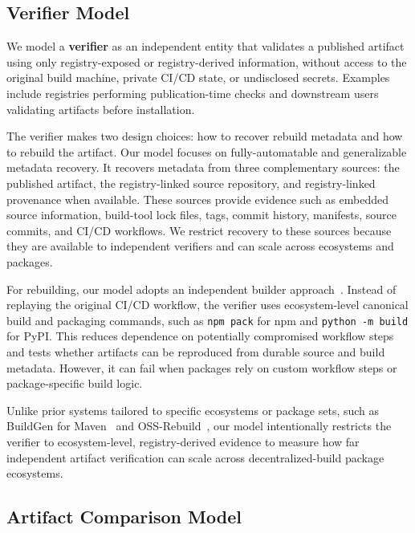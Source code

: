 \subsection{Verifier Model}
\label{subsec:verifier-model}

We model a \textbf{verifier} as an independent entity that validates a published artifact using only registry-exposed or registry-derived information, without access to the original build machine, private CI/CD state, or undisclosed secrets. Examples include registries performing publication-time checks and downstream users validating artifacts before installation.

The verifier makes two design choices: how to recover rebuild metadata and how to rebuild the artifact. 
Our model focuses on fully-automatable and generalizable metadata recovery.
It recovers metadata from three complementary sources: the published artifact, the registry-linked source repository, and registry-linked provenance when available. 
These sources provide evidence such as embedded source information, build-tool lock files, tags, commit history, manifests, source commits, and CI/CD workflows. 
We restrict recovery to these sources because they are available to independent verifiers and can scale across ecosystems and packages.

For rebuilding, our model adopts an independent builder approach~\cite{lamb_reproducible_2022}. 
Instead of replaying the original CI/CD workflow, the verifier uses ecosystem-level canonical build and packaging commands, such as \texttt{npm pack} for npm and \texttt{python -m build} for PyPI. 
This reduces dependence on potentially compromised workflow steps and tests whether artifacts can be reproduced from durable source and build metadata. 
However, it can fail when packages rely on custom workflow steps or package-specific build logic.

Unlike prior systems tailored to specific ecosystems or package sets, such as BuildGen for Maven~\cite{hassanshahiUnlockingReproducibilityAutomating2025} and OSS-Rebuild~\cite{google_oss_rebuild}, our model intentionally restricts the verifier to ecosystem-level, registry-derived evidence to measure how far independent artifact verification can scale across decentralized-build package ecosystems.


\subsection{Artifact Comparison Model}
\label{subsec:artifact-comparison-model}

